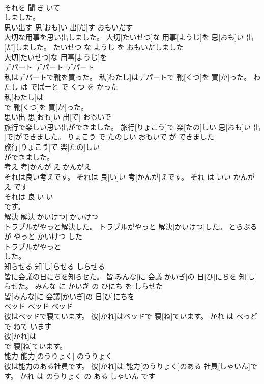\documentclass[8pt]{extreport}
\begin{document}
\begin{CJK}{UTF8}{min}
\\	それを 聞[き]いて
\\	しました。		
\\	思い出す	思[おも]い 出[だ]す	おもいだす	
\\	大切な用事を思い出しました。	大切[たいせつ]な 用事[ようじ]を 思[おも]い 出[だ]しました。	たいせつ な ようじ を おもいだしました	
\\	大切[たいせつ]な 用事[ようじ]を
\\	デパート	デパート	デパート	
\\	私はデパートで靴を買った。	私[わたし]はデパートで 靴[くつ]を 買[か]った。	わたし は でぱーと で くつ を かった	
\\	私[わたし]は
\\	で 靴[くつ]を 買[か]った。		
\\	思い出	思[おも]い 出[で]	おもいで	
\\	旅行で楽しい思い出ができました。	旅行[りょこう]で 楽[たの]しい 思[おも]い 出[で]ができました。	りょこう で たのしい おもいで が できました	
\\	旅行[りょこう]で 楽[たの]しい
\\	ができました。		
\\	考え	考[かんが]え	かんがえ	
\\	それは良い考えです。	それは 良[い]い 考[かんが]えです。	それ は いい かんがえ です	
\\	それは 良[い]い
\\	です。		
\\	解決	解決[かいけつ]	かいけつ	
\\	トラブルがやっと解決した。	トラブルがやっと 解決[かいけつ]した。	とらぶる が やっと かいけつ した	
\\	トラブルがやっと
\\	した。		
\\	知らせる	知[し]らせる	しらせる	
\\	皆に会議の日にちを知らせた。	皆[みんな]に 会議[かいぎ]の 日[ひ]にちを 知[し]らせた。	みんな に かいぎ の ひにち を しらせた	
\\	皆[みんな]に 会議[かいぎ]の 日[ひ]にちを
\\	ベッド	ベッド	ベッド	
\\	彼はベッドで寝ています。	彼[かれ]はベッドで 寝[ね]ています。	かれ は べっど で ねて います	
\\	彼[かれ]は
\\	で 寝[ね]ています。		
\\	能力	能力[のうりょく]	のうりょく	
\\	彼は能力のある社員です。	彼[かれ]は 能力[のうりょく]のある 社員[しゃいん]です。	かれ は のうりょく の ある しゃいん です	

\end{CJK}
\end{document}
